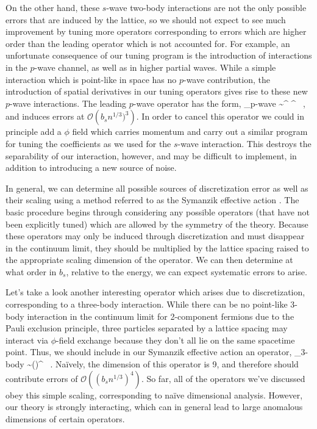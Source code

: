 On the other hand, these $s$-wave two-body interactions are not the only possible errors that are induced by the lattice, so we should not expect to see much improvement by tuning more operators corresponding to errors which are higher order than the leading operator which is not accounted for. For example, an unfortunate consequence of our tuning program is the introduction of interactions in the $p$-wave channel, as well as in higher partial waves. While a simple interaction which is point-like in space has no $p$-wave contribution, the introduction of spatial derivatives in our tuning operators gives rise to these new $p$-wave interactions. The leading $p$-wave operator has the form,
\beq
{}_{p\mbox{\tiny -wave}} \sim \psi^{\dagger} \vec{\nabla} \psi \cdot \psi^{\dagger} \vec{\nabla} \psi \ ,
\eeq
and induces errors at ${\mathcal{ O}}\left(b_s n^{1/3})^{3}\right)$. In order to cancel this operator we could in principle add a $\phi$ field which carries momentum and carry out a similar program for tuning the coefficients as we used for the $s$-wave interaction. This destroys the separability of our interaction, however, and may be difficult to implement, in addition to introducing a new source of noise.

In general, we can determine all possible sources of discretization error as well as their scaling using a method referred to as the Symanzik effective action \cite{Symanzik1,Symanzik2,Symanzik3,Symanzik4,EKLN4}. The basic procedure begins through considering any possible operators (that have not been explicitly tuned) which are allowed by the symmetry of the theory. Because these operators may only be induced through discretization and must disappear in the continuum limit, they should be multiplied by the lattice spacing raised to the appropriate scaling dimension of the operator. We can then determine at what order in $b_s$, relative to the energy, we can expect systematic errors to arise.

Let's take a look another interesting operator which arises due to discretization, corresponding to a three-body interaction. While there can be no point-like 3-body interaction in the continuum limit for 2-component fermions due to the Pauli exclusion principle, three particles separated by a lattice spacing may interact via $\phi$-field exchange because they don't all lie on the same spacetime point. Thus, we should include in our Symanzik effective action an operator,
\beq
{}_{\mbox{\tiny 3-body}} \sim \left(\psi \psi \psi \right)^{\dagger} \psi \psi \psi \ .
\eeq
Na\"ively, the dimension of this operator is 9, and therefore should contribute errors of ${\mathcal{ O}}\left((b_sn^{1/3})^4\right)$. So far, all of the operators we've discussed obey this simple scaling, corresponding to na\"ive dimensional analysis. However, our theory is strongly interacting, which can in general lead to large anomalous dimensions of certain operators. 

